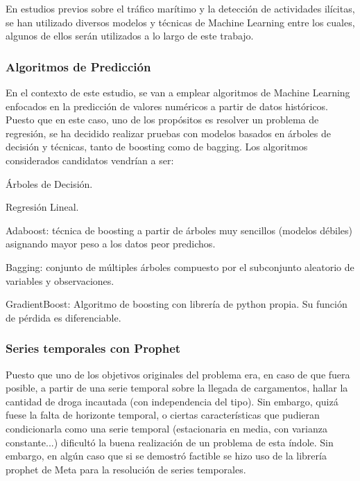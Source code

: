 \documentclass[12pt]{article}
\begin{document}
	En estudios previos sobre el tráfico marítimo y la detección de actividades ilícitas, se han utilizado diversos modelos y técnicas de Machine Learning entre los cuales, algunos de ellos serán utilizados a lo largo de este trabajo.
	
		\subsubsection{Algoritmos de Predicción}
		En el contexto de este estudio, se van a emplear algoritmos de Machine Learning enfocados en la predicción de valores numéricos a partir de datos históricos. Puesto que en este caso, uno de los propósitos es resolver un problema de regresión, se ha decidido realizar pruebas con modelos basados en árboles de decisión y técnicas, tanto de boosting como de bagging. Los algoritmos considerados candidatos vendrían a ser:
		
		\begin{description}
			\item Árboles de Decisión.
			\item Regresión Lineal.
			\item Adaboost: técnica de boosting a partir de árboles muy sencillos (modelos débiles) asignando mayor peso a los datos peor predichos.
			\item Bagging: conjunto de múltiples árboles compuesto por el subconjunto aleatorio de variables y observaciones.
			\item GradientBoost: Algoritmo de boosting con librería de python propia. Su función de pérdida es diferenciable.
		\end{description}


		\subsubsection{\label{prophet}Series temporales con Prophet}
		Puesto que uno de los objetivos originales del problema era, en caso de que fuera posible, a partir de una serie temporal sobre la llegada de cargamentos, hallar la cantidad de droga incautada (con independencia del tipo). Sin embargo, quizá fuese la falta de horizonte temporal, o ciertas características que pudieran condicionarla como una serie temporal (estacionaria en media, con varianza constante...) dificultó la buena realización de un problema de esta índole. Sin embargo, en algún caso que si se demostró factible se hizo uso de la librería prophet de Meta para la resolución de series temporales.
		
\end{document}
